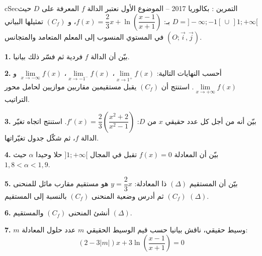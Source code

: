 \documentclass[12pt,a4paper]{article}
\newenvironment{BOX}[2]{\begin{otherlanguage}{english}\begin{arbox}{#1}{#2}}{\end{arbox}\end{otherlanguage}}
\newcounter{exo}
\newenvironment{tamrin}[1]{\stepcounter{exo}\begin{BOX}{cSec}{التمرين \theexo: #1}}{\end{BOX}}
\newcommand{\QQ}[1]{\par\smallskip\textbf{#1.} }
\begin{document}
\begin{tamrin}{بكالوريا 2017 -- الموضوع الأول}
نعتبر الدالة $f$ المعرفة على $D$ حيث $D=]-\infty;-1[\,\cup\,]1;+\infty[$ بـ: $f(x)=\dfrac23x+\ln\left(\dfrac{x-1}{x+1}\right)$،
و $(C_f)$ تمثيلها البياني في المستوي المنسوب إلى المعلم المتعامد والمتجانس $(O;\vec i,\vec j)$.
\QQ{1} بيّن أن الدالة $f$ فردية ثم فسّر ذلك بيانيا.
\QQ{2} أحسب النهايات التالية: $\lim\limits_{x\to 1^{+}}f(x)$، $\lim\limits_{x\to -1^{-}}f(x)$، $\lim\limits_{x\to -\infty}f(x)$ و $\lim\limits_{x\to +\infty}f(x)$.
استنتج أن $(C_f)$ يقبل مستقيمين مقاربين موازيين لحامل محور التراتيب.
\QQ{3} بيّن أنه من أجل كل عدد حقيقي $x$ من $D$: $f'(x)=\dfrac23\left(\dfrac{x^2+2}{x^2-1}\right)$.
استنتج اتجاه تغيّر الدالة $f$، ثم شكّل جدول تغيّراتها.
\QQ{4} بيّن أن المعادلة $f(x)=0$ تقبل في المجال $]1;+\infty[$ حلا وحيدا $\alpha$ حيث $1{,}8<\alpha<1{,}9$.
\QQ{5} بيّن أن المستقيم $(\Delta)$ ذا المعادلة: $y=\dfrac23x$ هو مستقيم مقارب مائل للمنحنى $(C_f)$ ثم أدرس وضعية المنحنى $(C_f)$ بالنسبة إلى المستقيم $(\Delta)$.
\QQ{6} أنشئ المنحنى $(C_f)$ والمستقيم $(\Delta)$.
\QQ{7} $m$ وسيط حقيقي، ناقش بيانيا حسب قيم الوسيط الحقيقي $m$ عدد حلول المعادلة:
\[(2-3|m|)x+3\ln\left(\frac{x-1}{x+1}\right)=0\]
\end{tamrin}
\end{document}
